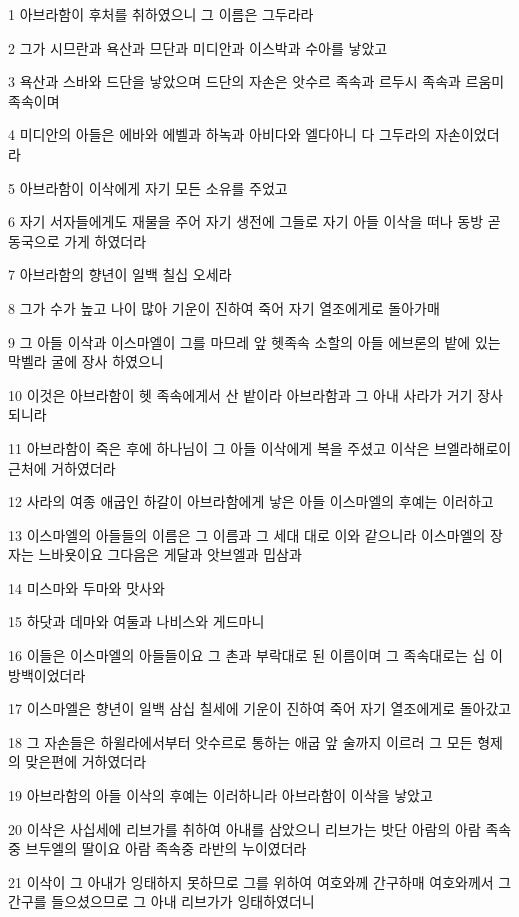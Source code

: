\par 1 아브라함이 후처를 취하였으니 그 이름은 그두라라
\par 2 그가 시므란과 욕산과 므단과 미디안과 이스박과 수아를 낳았고
\par 3 욕산과 스바와 드단을 낳았으며 드단의 자손은 앗수르 족속과 르두시 족속과 르움미 족속이며
\par 4 미디안의 아들은 에바와 에벨과 하녹과 아비다와 엘다아니 다 그두라의 자손이었더라
\par 5 아브라함이 이삭에게 자기 모든 소유를 주었고
\par 6 자기 서자들에게도 재물을 주어 자기 생전에 그들로 자기 아들 이삭을 떠나 동방 곧 동국으로 가게 하였더라
\par 7 아브라함의 향년이 일백 칠십 오세라
\par 8 그가 수가 높고 나이 많아 기운이 진하여 죽어 자기 열조에게로 돌아가매
\par 9 그 아들 이삭과 이스마엘이 그를 마므레 앞 헷족속 소할의 아들 에브론의 밭에 있는 막벨라 굴에 장사 하였으니
\par 10 이것은 아브라함이 헷 족속에게서 산 밭이라 아브라함과 그 아내 사라가 거기 장사되니라
\par 11 아브라함이 죽은 후에 하나님이 그 아들 이삭에게 복을 주셨고 이삭은 브엘라해로이 근처에 거하였더라
\par 12 사라의 여종 애굽인 하갈이 아브라함에게 낳은 아들 이스마엘의 후예는 이러하고
\par 13 이스마엘의 아들들의 이름은 그 이름과 그 세대 대로 이와 같으니라 이스마엘의 장자는 느바욧이요 그다음은 게달과 앗브엘과 밉삼과
\par 14 미스마와 두마와 맛사와
\par 15 하닷과 데마와 여둘과 나비스와 게드마니
\par 16 이들은 이스마엘의 아들들이요 그 촌과 부락대로 된 이름이며 그 족속대로는 십 이 방백이었더라
\par 17 이스마엘은 향년이 일백 삼십 칠세에 기운이 진하여 죽어 자기 열조에게로 돌아갔고
\par 18 그 자손들은 하윌라에서부터 앗수르로 통하는 애굽 앞 술까지 이르러 그 모든 형제의 맞은편에 거하였더라
\par 19 아브라함의 아들 이삭의 후예는 이러하니라 아브라함이 이삭을 낳았고
\par 20 이삭은 사십세에 리브가를 취하여 아내를 삼았으니 리브가는 밧단 아람의 아람 족속 중 브두엘의 딸이요 아람 족속중 라반의 누이였더라
\par 21 이삭이 그 아내가 잉태하지 못하므로 그를 위하여 여호와께 간구하매 여호와께서 그 간구를 들으셨으므로 그 아내 리브가가 잉태하였더니
